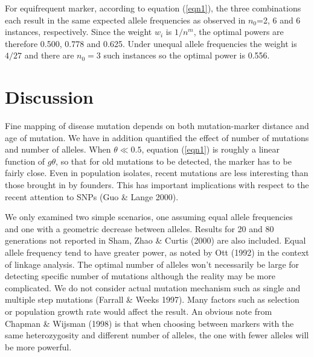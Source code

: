 For equifrequent marker, according to equation (\ref{eqn1}), the
three combinations each result in the same expected allele frequencies as
observed in $n_0$=2, 6 and 6 instances, respectively. Since the weight
$w_i$ is $1/n^m$, the optimal powers are therefore 0.500, 0.778 and 0.625.
Under unequal allele frequencies the weight is $4/27$ and there are
$n_0=3$ such instances so the optimal power is 0.556.


\section{Discussion}

Fine mapping of disease mutation depends on both mutation-marker distance and
age of mutation.  We have in addition quantified the effect of number of
mutations and number of alleles.  When $\theta\ll 0.5$, equation (\ref{eqn1})
is roughly a linear function of $g\theta$, so that for old mutations to be
detected, the marker has to be fairly close.  Even in population isolates,
recent mutations are less interesting than those brought in by founders.  This
has important implications with respect to the recent attention to SNPs (Guo \&
Lange 2000).

We only examined two simple scenarios, one assuming equal allele frequencies
and one with a geometric decrease between alleles.  Results for 20 and 80
generations not reported in Sham, Zhao \& Curtis (2000) are also included.
Equal allele frequency tend to have greater power, as noted by Ott (1992) in
the context of linkage analysis.  The optimal number of alleles won't
necessarily be large for detecting specific number of mutations although the
reality may be more complicated.  We do not consider actual mutation mechanism
such as single and multiple step mutations (Farrall \& Weeks 1997).  Many
factors such as selection or population growth rate would affect the result.
An obvious note from Chapman \& Wijsman (1998) is that when choosing between
markers with the same heterozygosity and different number of alleles, the one
with fewer alleles will be more powerful.

